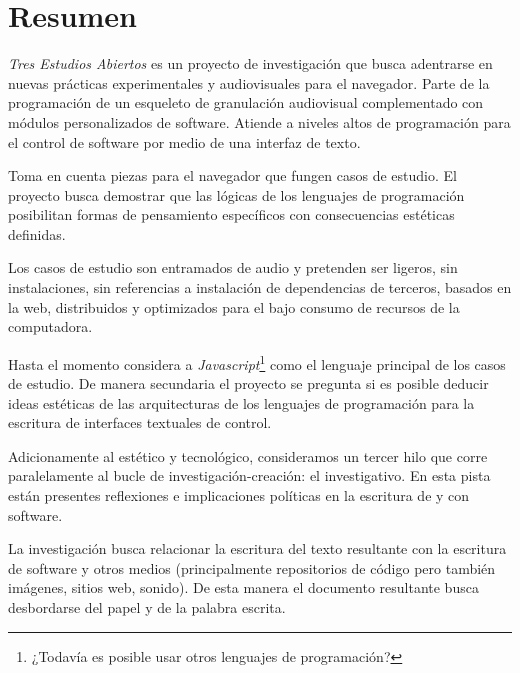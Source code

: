 
\section*{Resumen}

\textit{Tres Estudios Abiertos} es un proyecto de investigación que busca adentrarse en nuevas prácticas experimentales y audiovisuales para el navegador. Parte de la programación de un esqueleto de granulación audiovisual complementado con módulos personalizados de software. Atiende a niveles altos de programación para el control de software por medio de una interfaz de texto. 

Toma en cuenta piezas para el navegador que fungen casos de estudio. El proyecto busca demostrar que las lógicas de los lenguajes de programación posibilitan formas de pensamiento específicos con consecuencias estéticas definidas. 

Los casos de estudio son entramados de audio y pretenden ser ligeros, sin instalaciones, sin referencias a instalación de dependencias de terceros, basados en la web, distribuidos y optimizados para el bajo consumo de recursos de la computadora. 

Hasta el momento considera a \textit{Javascript}\footnote{¿Todavía es posible usar otros lenguajes de programación?} como el lenguaje principal de los casos de estudio. De manera secundaria el proyecto se pregunta si es posible deducir ideas estéticas de las arquitecturas de los lenguajes de programación para la escritura de interfaces textuales de control. 

Adicionamente al estético y tecnológico, consideramos un tercer hilo que corre paralelamente al bucle de investigación-creación: el investigativo. En esta pista están presentes reflexiones e implicaciones políticas en la escritura de y con software.

La investigación busca relacionar la escritura del texto resultante con la escritura de software y otros medios (principalmente repositorios de código pero también imágenes, sitios web, sonido). De esta manera el documento resultante busca desbordarse del papel y de la palabra escrita. 
